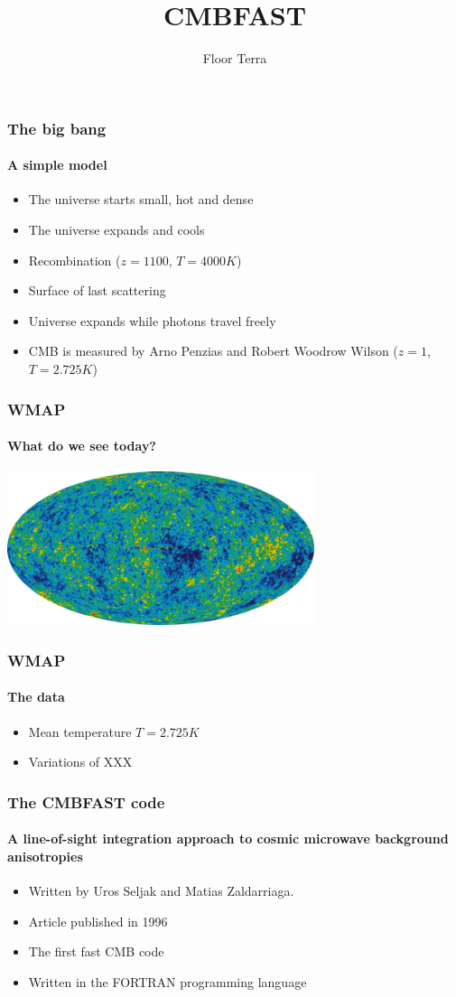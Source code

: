 \documentclass{beamer}
\title{CMBFAST}
\author{Floor Terra}
\begin{document}
	\begin{frame}
		\titlepage
	\end{frame} 
	
	\begin{frame}
		\frametitle{The big bang}
		\framesubtitle{A simple model}
		\begin{itemize}
			\item The universe starts small, hot and dense
			\item The universe expands and cools
			\item Recombination ($z=1100$, $T=4000K$)
			\item Surface of last scattering
			\item Universe expands while photons travel freely
			\item CMB is measured by Arno Penzias and Robert Woodrow Wilson ($z=1$, $T=2.725K$)
		\end{itemize}
	\end{frame}
	
	\begin{frame}
		\frametitle{WMAP}
		\framesubtitle{What do we see today?}
		\begin{center}
			\includegraphics[width=90mm]{WMAP.png}
		\end{center}
	\end{frame}
	
	\begin{frame}
		\frametitle{WMAP}
		\framesubtitle{The data}
		\begin{itemize}
			\item Mean temperature $T=2.725K$
			\item Variations of XXX
			
		\end{itemize}
	\end{frame}
	
	\begin{frame}
		\frametitle{The CMBFAST code}
		\framesubtitle{A line-of-sight integration approach to cosmic microwave background anisotropies}
		\begin{itemize}
			\item Written by Uros Seljak and Matias Zaldarriaga.
			\item Article published in 1996
			\item The first fast CMB code
			\item Written in the FORTRAN programming language
		\end{itemize}
	\end{frame}
	
\end{document}
